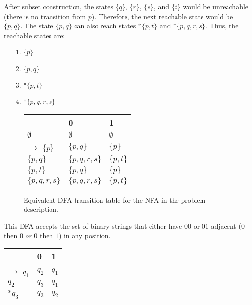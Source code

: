 \documentclass[12pt]{article}
\begin{document}
After subset construction, the states $\{q\}$, $\{r\}$, $\{s\}$, and $\{t\}$
would be unreachable (there is no transition from $p$). Therefore, the next
reachable state would be $\{p,q\}$. The state $\{p,q\}$ can also reach states
$*\{p,t\}$ and $*\{p,q,r,s\}$. Thus, the reachable states are:
\begin{itemize}
    \item[1.] $\{p\}$
    \item[2.] $\{p,q\}$
    \item[3.] $*\{p,t\}$
    \item[4.] $*\{p,q,r,s\}$
\end{itemize}

\begin{figure}[ht]
    \centering
    \begin{tabular}{l||l|l}
                              & 0             & 1           \\
        \hline
        $\emptyset$           & $\emptyset$   & $\emptyset$ \\
        \hline
        $\rightarrow$ $\{p\}$ & $\{p,q\}$     & $\{p\}$     \\
        \hline
        $\{p,q\}$             & $\{p,q,r,s\}$ & $\{p,t\}$   \\
        \hline
        $\{p,t\}$             & $\{p,q\}$     & $\{p\}$     \\
        \hline
        $\{p,q,r,s\}$         & $\{p,q,r,s\}$ & $\{p,t\}$   \\
        \hline
    \end{tabular}
    \label{tab:nfa_2_func}
    \caption{Equivalent DFA transition table for the NFA in the problem description.}
\end{figure}

This DFA accepts the set of binary strings that either have $00$ or $01$
adjacent ($0$ then $0$ \textit{or} $0$ then $1$) in any position.


\begin{table}[ht]
    \centering
    \begin{tabular}{ p{1cm}||p{0.5cm}|p{0.5cm} } & 0     & 1     \\
               \hline
               $\rightarrow$ $q_1$           & $q_2$ & $q_1$ \\
               \hline
               $q_2$                         & $q_3$ & $q_1$ \\
               \hline
               $*q_3$                        & $q_3$ & $q_2$ \\
               \hline
    \end{tabular}
    \label{tab:dfa_3_func}
\end{table}
\end{document}
